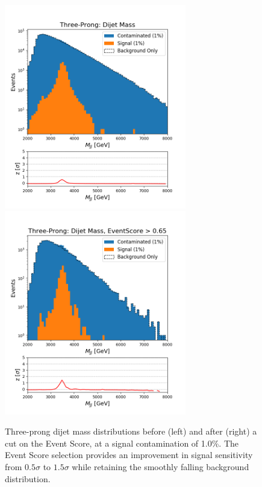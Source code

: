 \documentclass[12pt, a4paper]{article}
\begin{document}
\begin{figure}[H]
	\begin{center}
		\includegraphics[width=225pt]{imgs/3Prong_Contaminated_1p0_JJ_Mass_Multi_SaveForPaper.png}
		\includegraphics[width=225pt]{imgs/3Prong_Contaminated_1p0_JJ_Mass_EventScore0p65_Multi_SaveForPaper.png}
	\end{center}
	\caption{Three-prong dijet mass distributions before (left) and after (right) a cut on the Event Score, at a signal contamination of 1.0\%. The Event Score selection provides an improvement in signal sensitivity from $0.5\sigma$ to $1.5\sigma$ while retaining the smoothly falling background distribution.}
	\label{fig:3p_dijet}
\end{figure}



\end{document}
